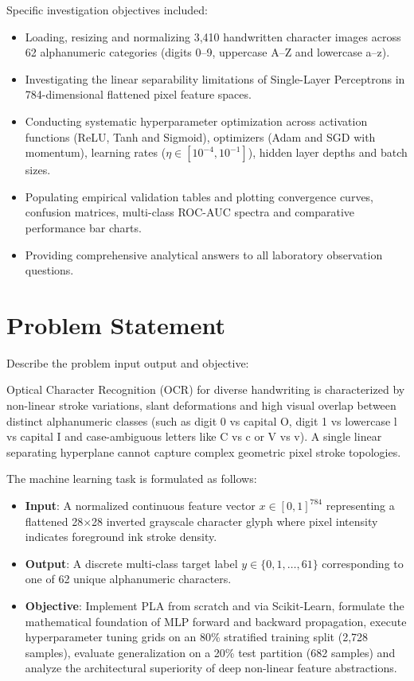 \documentclass[12pt,a4paper]{article}
\begin{document}
Specific investigation objectives included:
\begin{itemize}
\item Loading, resizing and normalizing 3,410 handwritten character images across 62 alphanumeric categories (digits 0--9, uppercase A--Z and lowercase a--z).
\item Investigating the linear separability limitations of Single-Layer Perceptrons in 784-dimensional flattened pixel feature spaces.
\item Conducting systematic hyperparameter optimization across activation functions (ReLU, Tanh and Sigmoid), optimizers (Adam and SGD with momentum), learning rates ($\eta \in [10^{-4}, 10^{-1}]$), hidden layer depths and batch sizes.
\item Populating empirical validation tables and plotting convergence curves, confusion matrices, multi-class ROC-AUC spectra and comparative performance bar charts.
\item Providing comprehensive analytical answers to all laboratory observation questions.
\end{itemize}

\section{Problem Statement}
Describe the problem input output and objective:

Optical Character Recognition (OCR) for diverse handwriting is characterized by non-linear stroke variations, slant deformations and high visual overlap between distinct alphanumeric classes (such as digit 0 vs capital O, digit 1 vs lowercase l vs capital I and case-ambiguous letters like C vs c or V vs v). A single linear separating hyperplane cannot capture complex geometric pixel stroke topologies.

The machine learning task is formulated as follows:
\begin{itemize}
\item \textbf{Input}: A normalized continuous feature vector $x \in [0, 1]^{784}$ representing a flattened 28$\times$28 inverted grayscale character glyph where pixel intensity indicates foreground ink stroke density.
\item \textbf{Output}: A discrete multi-class target label $y \in \{0, 1, \dots, 61\}$ corresponding to one of 62 unique alphanumeric characters.
\item \textbf{Objective}: Implement PLA from scratch and via Scikit-Learn, formulate the mathematical foundation of MLP forward and backward propagation, execute hyperparameter tuning grids on an 80\% stratified training split (2,728 samples), evaluate generalization on a 20\% test partition (682 samples) and analyze the architectural superiority of deep non-linear feature abstractions.
\end{itemize}
\end{document}
